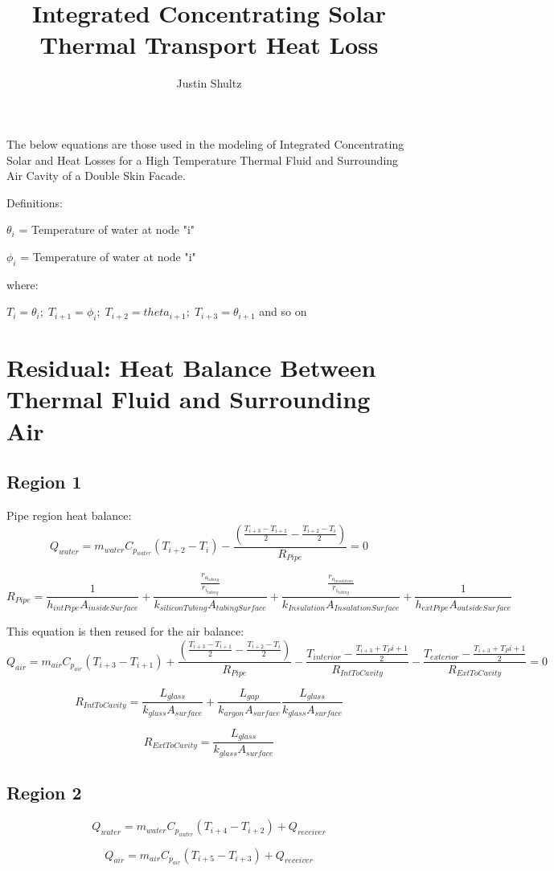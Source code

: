 \documentclass[12pt]{report}
\author{Justin Shultz}
\title{Integrated Concentrating Solar Thermal Transport Heat Loss}
\begin{document}
The below equations are those used in the modeling of Integrated Concentrating Solar and Heat Losses for a High Temperature Thermal Fluid and Surrounding Air Cavity of a Double Skin Facade.

Definitions: 

$\theta_i$ = Temperature of water at node "i"

$\phi_i$ = Temperature of water at node "i"

where:

$ T_i = \theta_i; \; T_{i+1} = \phi_i; \; T_{i+2} = theta_{i+1}; \; T_{i+3} = \theta_{i+1}$ and so on 

\section{Residual: Heat Balance Between Thermal Fluid and Surrounding Air}

\subsection{Region 1}
Pipe region heat balance:
$$ Q_{water} = m_{water} C_{p_{water}} (T_{i+2}-T_i) - 
		\frac
			{\left( 
				\frac{T_{i+3}-T_{i+1}}{2} - \frac{T_{i+2}-T_{i}}{2} 
			\right)}
		{R_{Pipe}}
		= 0 $$

$$ R_{Pipe} = 
	\frac{1}
	{h_{intPipe} A_{insideSurface}} 
	+ \frac{
		\frac{r_{o_{tubing}}}
		{r_{i_{tubing}}}
		}
		{k_{siliconTubing} A_{tubingSurface}} 
	+ \frac{
		\frac{r_{o_{insulation}}}
		{r_{i_{tubing}}}
		}
		{k_{Insulation} A_{InsulationSurface}} 
	+ \frac{1}
	{h_{extPipe} A_{outsideSurface}} $$

This equation is then reused for the air balance:
$$ Q_{air} = m_{air} C_{p_{air}} (T_{i+3}-T_{i+1}) 
	+ \frac{
		\left( 
			\frac{T_{i+3}-T_{i+1}}{2} 
			- \frac{T_{i+2}-T_{i}}{2} 
		\right)}
		{R_{Pipe}} 
	- \frac{T_{interior} - \frac{T_{i+3}+T_P{i+1}}{2}}{R_{IntToCavity}}
	- \frac{T_{exterior} - \frac{T_{i+3}+T_P{i+1}}{2}}{R_{ExtToCavity}} = 0 $$
	
$$ R_{IntToCavity} = \frac{L_{glass}}{k_{glass}  A_{surface}} 
	+ \frac{L_{gap}}{k_{argon}  A_{surface}} 
	\frac{L_{glass}}{k_{glass}  A_{surface}} $$
	
$$ R_{ExtToCavity} = \frac{L_{glass}}{k_{glass}  A_{surface}}$$

\subsection{Region 2}

$$ Q_{water} = m_{water} C_{p_{water}} (T_{i+4} - T_{i+2}) + Q_{receiver} $$

$$ Q_{air} = m_{air} C_{p_{air}} (T_{i+5} - T_{i+3}) + Q_{receiver} $$
        

        
\end{document}
